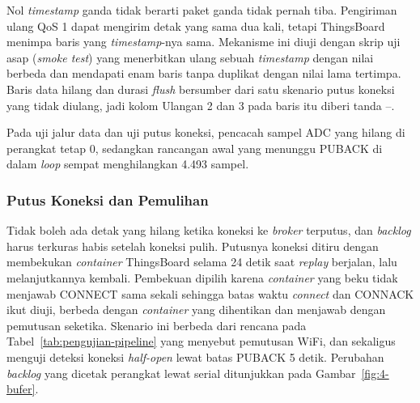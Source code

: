 Nol \textit{timestamp} ganda tidak berarti paket ganda tidak pernah tiba. Pengiriman ulang QoS 1 dapat mengirim detak yang sama dua kali, tetapi ThingsBoard menimpa baris yang \textit{timestamp}-nya sama. Mekanisme ini diuji dengan skrip uji asap (\textit{smoke test}) yang menerbitkan ulang sebuah \textit{timestamp} dengan nilai berbeda dan mendapati enam baris tanpa duplikat dengan nilai lama tertimpa. Baris data hilang dan durasi \textit{flush} bersumber dari satu skenario putus koneksi yang tidak diulang, jadi kolom Ulangan 2 dan 3 pada baris itu diberi tanda --.

Pada uji jalur data dan uji putus koneksi, pencacah sampel ADC yang hilang di perangkat tetap 0, sedangkan rancangan awal yang menunggu PUBACK di dalam \textit{loop} sempat menghilangkan 4.493 sampel.

\subsubsection{Putus Koneksi dan Pemulihan}

Tidak boleh ada detak yang hilang ketika koneksi ke \textit{broker} terputus, dan \textit{backlog} harus terkuras habis setelah koneksi pulih. Putusnya koneksi ditiru dengan membekukan \textit{container} ThingsBoard selama 24 detik saat \textit{replay} berjalan, lalu melanjutkannya kembali. Pembekuan dipilih karena \textit{container} yang beku tidak menjawab CONNECT sama sekali sehingga batas waktu \textit{connect} dan CONNACK ikut diuji, berbeda dengan \textit{container} yang dihentikan dan menjawab dengan pemutusan seketika. Skenario ini berbeda dari rencana pada Tabel~\ref{tab:pengujian-pipeline} yang menyebut pemutusan WiFi, dan sekaligus menguji deteksi koneksi \textit{half-open} lewat batas PUBACK 5 detik. Perubahan \textit{backlog} yang dicetak perangkat lewat serial ditunjukkan pada Gambar~\ref{fig:4-bufer}.

